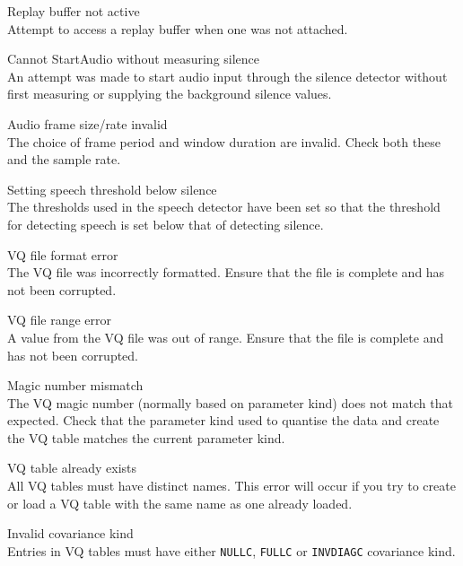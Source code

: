 \begin{itemize}

\begin{itemize}
    Replay buffer not active\\
        Attempt to access a replay buffer when one was not attached.

    Cannot StartAudio without measuring silence\\
        An attempt was made to start audio input through the silence detector 
        without first measuring or supplying the background silence values.

    Audio frame size/rate invalid\\
        The choice of frame period and window duration are invalid.  Check
        both these and the sample rate.

    Setting speech threshold below silence\\
        The thresholds used in the speech detector have been set so that the
        threshold for detecting speech is set below that of detecting silence.

\end{itemize}


\begin{itemize}
    VQ file format error\\
        The VQ file was incorrectly formatted.  Ensure that the file is 
        complete and has not been corrupted.

    VQ file range error\\
        A value from the VQ file was out of range.  Ensure that the file is 
        complete and has not been corrupted.

    Magic number mismatch\\
        The VQ magic number (normally based on parameter kind) does not match
        that expected.  Check that the parameter kind used to quantise the data
        and create the VQ table matches the current parameter kind.

    VQ table already exists\\
        All VQ tables must have distinct names.  This error will occur if you
        try to create or load a VQ table with the same name as one already
        loaded.

    Invalid covariance kind\\
        Entries in VQ tables must have either \texttt{NULLC}, \texttt{FULLC} or
        \texttt{INVDIAGC} covariance kind.


\end{itemize}
\end{itemize}
